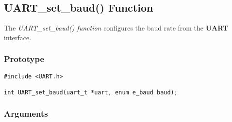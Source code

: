 \documentclass{report}
\begin{document}
\subsection{UART\_set\_baud() Function}
The \textit{UART\_set\_baud() function} configures the baud rate
from the \textbf{UART} interface.
\subsubsection*{Prototype}
\begin{lstlisting}
#include <UART.h>

int UART_set_baud(uart_t *uart, enum e_baud baud);
\end{lstlisting}
\subsubsection*{Arguments}
\end{document}
